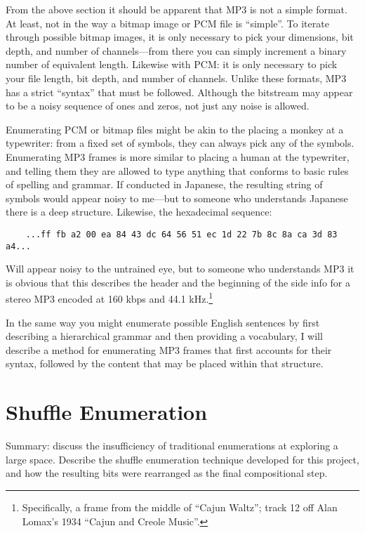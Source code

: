 \documentclass{thesis}
\begin{document}
	From the above section it should be apparent that MP3 is not a simple format. At least, not in the way a bitmap image or PCM file is ``simple''. To iterate through possible bitmap images, it is only necessary to pick your dimensions, bit depth, and number of channels---from there you can simply increment a binary number of equivalent length. Likewise with PCM: it is only necessary to pick your file length, bit depth, and number of channels. Unlike these formats, MP3 has a strict ``syntax'' that must be followed. Although the bitstream may appear to be a noisy sequence of ones and zeros, not just any noise is allowed.
	
	Enumerating PCM or bitmap files might be akin to the placing a monkey at a typewriter: from a fixed set of symbols, they can always pick any of the symbols. Enumerating MP3 frames is more similar to placing a human at the typewriter, and telling them they are allowed to type anything that conforms to basic rules of spelling and grammar. If conducted in Japanese, the resulting string of symbols would appear noisy to me---but to someone who understands Japanese there is a deep structure. Likewise, the hexadecimal sequence:
	
	\begin{verbatim}
	...ff fb a2 00 ea 84 43 dc 64 56 51 ec 1d 22 7b 8c 8a ca 3d 83 a4...
	\end{verbatim}
	
	Will appear noisy to the untrained eye, but to someone who understands MP3 it is obvious that this describes the header and the beginning of the side info for a stereo MP3 encoded at 160 kbps and 44.1 kHz.\footnote{Specifically, a frame from the middle of ``Cajun Waltz''; track 12 off Alan Lomax's 1934 ``Cajun and Creole Music''.}
	
	In the same way you might enumerate possible English sentences by first describing a hierarchical grammar and then providing a vocabulary, I will describe a method for enumerating MP3 frames that first accounts for their syntax, followed by the content that may be placed within that structure.
	
\section{Shuffle Enumeration}

	Summary: discuss the insufficiency of traditional enumerations at exploring a large space. Describe the shuffle enumeration technique developed for this project, and how the resulting bits were rearranged as the final compositional step.
	
\end{document}
